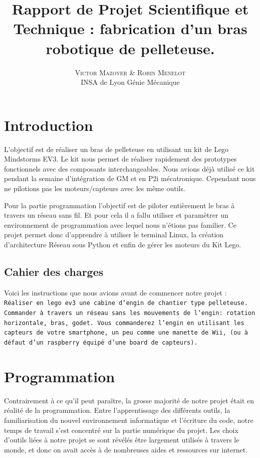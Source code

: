 \documentclass[twoside,twocolumn, 16pt]{article}
\title{Rapport de Projet Scientifique et Technique : fabrication d'un bras robotique de pelleteuse.} %
\author{%
\textsc{Victor Mazoyer \& Robin Menelot} \\[1ex] %
\normalsize INSA de Lyon \quad Génie Mécanique \\ %
}
\date{} %
\begin{document}
\maketitle


\section{Introduction}

\lettrine[nindent=0em,lines=3]{L}'objectif est de réaliser un bras de pelleteuse en utilisant un kit de Lego Mindstorms EV3. 
Le kit nous permet de réaliser rapidement des prototypes fonctionnels avec des composants interchangeables.  Nous avions déjà utilisé ce kit pendant la semaine d'intégration de GM et en P2i mécatronique. Cependant nous ne pilotions pas les moteurs/capteurs avec les même outils.

Pour la partie programmation l'objectif est de piloter entièrement le bras à travers un réseau sans fil. Et pour cela il a fallu utiliser et paramètrer un environnement de programmation avec lequel nous n'étions pas familier. Ce projet permet donc d'apprendre à utiliser le terminal Linux, la création d'architecture Réseau sous Python et enfin de gérer les moteurs du Kit Lego.

\subsection{Cahier des charges}
\begin{displayquote}
Voici les instructions que nous avions avant de commencer notre projet : \\
\texttt{Réaliser en lego ev3 une cabine d'engin de chantier type pelleteuse. Commander à travers un réseau sans les mouvements de l'engin: rotation horizontale, bras, godet. Vous commanderez l'engin en utilisant les capteurs de votre smartphone, un peu comme une manette de Wii, (ou à défaut d'un raspberry équipé d'une board de capteurs).}
\end{displayquote}

\section{Programmation}
Contrairement à ce qu’il peut paraître, la grosse majorité de notre projet était en réalité de la programmation. Entre l’apprentissage des différents outils, la familiarisation du nouvel environnement informatique et l’écriture du code, notre temps de travail s’est concentré sur la partie numérique du projet. Les choix d’outils liées à notre projet se sont révélés être largement utilisés à travers le monde, et donc on avait accès à de nombreuses aides et ressources sur internet.
\end{document}
